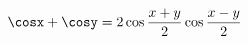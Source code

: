 \documentclass[preview]{standalone}
\begin{document}
\begin{align*}
\cosx+\cosy = 2 \cos\frac{x+y}{2}\cos\frac{x-y}{2}
\end{align*}
\end{document}
